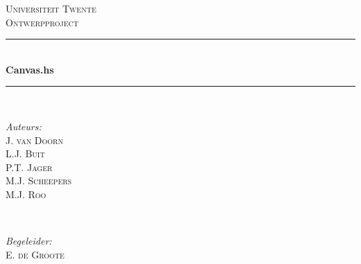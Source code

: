 \begin{titlepage}

\newcommand{\HRule}{\rule{\linewidth}{0.5mm}} %

\center %
\vspace*{\fill}
 

\textsc{\LARGE Universiteit Twente}\\[1.5cm] %
\textsc{\Large Ontwerpproject}\\[2.0cm] %


\HRule \\[0.6cm]
{ \huge \bfseries Canvas.hs}\\[0.4cm] %
\HRule \\[1.8cm]
 

\begin{minipage}[t]{0.4\textwidth}
\begin{flushleft} \large
\emph{Auteurs:}\\
J. \textsc{van Doorn}\\
L.J. \textsc{Buit}\\
P.T. \textsc{Jager}\\
M.J. \textsc{Scheepers}\\
M.J. \textsc{Roo}
\end{flushleft}
\end{minipage}
~
\begin{minipage}[t]{0.4\textwidth}
\begin{flushright} \large
\emph{Begeleider:} \\
E. \textsc{de Groote}
\end{flushright}
\end{minipage}\\[4cm]


\end{titlepage}
